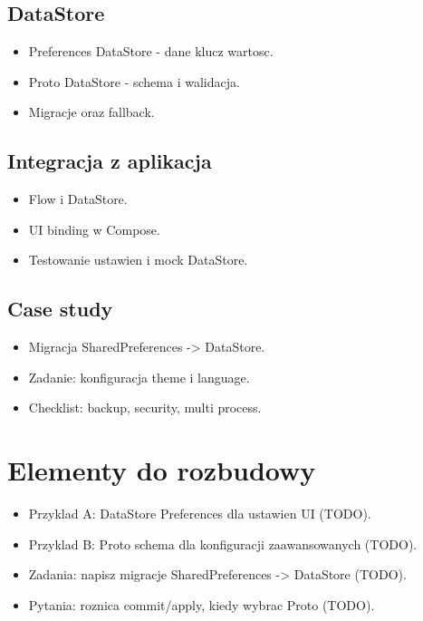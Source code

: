 \subsection{DataStore}
\begin{itemize}
  \item Preferences DataStore - dane klucz wartosc.
  \item Proto DataStore - schema i walidacja.
  \item Migracje oraz fallback.
\end{itemize}

\subsection{Integracja z aplikacja}
\begin{itemize}
  \item Flow i DataStore.
  \item UI binding w Compose.
  \item Testowanie ustawien i mock DataStore.
\end{itemize}

\subsection{Case study}
\begin{itemize}
  \item Migracja SharedPreferences -> DataStore.
  \item Zadanie: konfiguracja theme i language.
  \item Checklist: backup, security, multi process.
\end{itemize}

\section{Elementy do rozbudowy}
\begin{itemize}
  \item Przyklad A: DataStore Preferences dla ustawien UI (TODO).
  \item Przyklad B: Proto schema dla konfiguracji zaawansowanych (TODO).
  \item Zadania: napisz migracje SharedPreferences -> DataStore (TODO).
  \item Pytania: roznica commit/apply, kiedy wybrac Proto (TODO).
\end{itemize}

